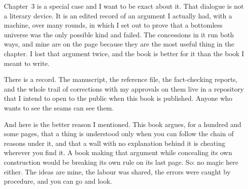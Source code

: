 Chapter~3 is a special case and I want to be exact about it. That dialogue is not a literary device. It is an edited record of an argument I actually had, with a machine, over many rounds, in which I set out to prove that a bottomless universe was the only possible kind and failed. The concessions in it run both ways, and mine are on the page because they are the most useful thing in the chapter. I lost that argument twice, and the book is better for it than the book I meant to write.

There is a record. The manuscript, the reference file, the fact-checking reports, and the whole trail of corrections with my approvals on them live in a repository that I intend to open to the public when this book is published. Anyone who wants to see the seams can see them.

And here is the better reason I mentioned. This book argues, for a hundred and some pages, that a thing is understood only when you can follow the chain of reasons under it, and that a wall with no explanation behind it is cheating wherever you find it. A book making that argument while concealing its own construction would be breaking its own rule on its last page. So: no magic here either. The ideas are mine, the labour was shared, the errors were caught by procedure, and you can go and look.

